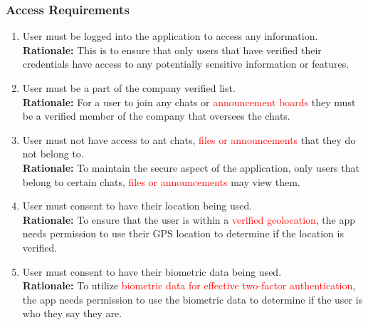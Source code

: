 \documentclass[]{article}
\begin{document}
\subsubsection{Access Requirements}
\label{ssub:access_requirements}
\begin{enumerate}[{SR-AC}1. ]
	\item User must be logged into the application to access any information.
	      \\\textbf{Rationale:} This is to ensure that only users that have verified their credentials have access to any potentially sensitive information or features.
	\item User must be a part of the company verified list.
	      \\\textbf{Rationale:} For a user to join any chats or \textcolor{red}{announcement boards} they must be a verified member of the company that oversees the chats.
	\item User must not have access to ant chats, \textcolor{red}{files or announcements} that they do not belong to.
	      \\\textbf{Rationale:} To maintain the secure aspect of the application, only users that belong to certain chats, \textcolor{red}{files or announcements} may view them.
	\item User must consent to have their location being used.
	      \\\textbf{Rationale:} To ensure that the user is within a \textcolor{red}{verified geolocation}, the app needs permission to use their GPS location to determine if the location is verified.
	\item User must consent to have their biometric data being used.
	      \\\textbf{Rationale:} To utilize \textcolor{red}{biometric data for effective two-factor authentication}, the app needs permission to use the biometric data to determine if the user is who they say they are.
\end{enumerate}
\end{document}
